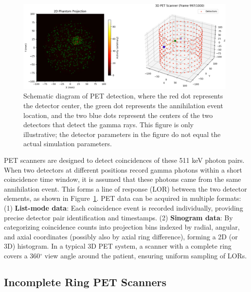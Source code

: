 \documentclass[
reprint,
superscriptaddress,
nofootinbib,
amsmath,amssymb,
aps,
prd,
]{revtex4-2}
\begin{document}
\begin{figure}[htbp]
    \centering
    \vspace{-0.2cm}
    \includegraphics[width=0.98\textwidth]{Images/Screenshot2025-02-07214940}
    \vspace{-0.2cm}
    \caption{Schematic diagram of PET detection, where the red dot represents the detector center, the green dot represents the annihilation event location, and the two blue dots represent the centers of the two detectors that detect the gamma rays. This figure is only illustrative; the detector parameters in the figure do not equal the actual simulation parameters.}
    \vspace{-0.2cm}
    \label{fig:pet_event}
\end{figure}

PET scanners are designed to detect coincidences of these 511 keV photon pairs. When two detectors at different positions record gamma photons within a short coincidence time window, it is assumed that these photons came from the same annihilation event. This forms a line of response (LOR) between the two detector elements, as shown in Figure~\ref{fig:pet_event}.
PET data can be acquired in multiple formats:
(1) \textbf{List-mode data}: Each coincidence event is recorded individually, providing precise detector pair identification and timestamps.
(2) \textbf{Sinogram data}: By categorizing coincidence counts into projection bins indexed by radial, angular, and axial coordinates (possibly also by axial ring difference), forming a 2D (or 3D) histogram.
In a typical 3D PET system, a scanner with a complete ring covers a 360$^\circ$ view angle around the patient, ensuring uniform sampling of LORs.

\subsection{Incomplete Ring PET Scanners}
\end{document}
